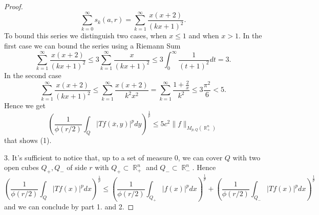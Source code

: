 \documentclass[12pt]{article}
\theoremstyle{definition}
\DeclareMathOperator\rr{\mathbb{R}}
\begin{document}
\begin{proof}
\[\sum_{k=0}^\infty s_k(a,r)= \sum_{k=1}^\infty \frac{x(x+2)}{(kx+1)^2}.\]
To bound this series we distinguish two cases, when $x\le 1$ and when $x>1$. In the first case we can bound the series using a Riemann Sum
\[ \sum_{k=1}^\infty \frac{x(x+2)}{(kx+1)^2} \le 3\sum_{k=1}^\infty \frac{x}{(kx+1)^2}\le 3 \int_0^\infty \frac{1}{(t+1)^2}dt=3. \]
In the second case
\[  \sum_{k=1}^\infty \frac{x(x+2)}{(kx+1)^2}  \le \sum_{k=1}^\infty \frac{x(x+2)}{k^2x^2}=\sum_{k=1}^\infty \frac{1+\frac{2}{x}}{k^2} \le 3 \frac{\pi^2}{6}<5.\]
Hence we get 
\[\left(\frac{1}{\phi(r/2)}\int_Q|Tf(\overline x,y)|^p dy\right)^{\frac{1}{p}} \le 5c^2 \| f\|_{M_{p,Q}(\rr^n_+)} \]
that shows (1). 

3. It's sufficient to notice that, up to a set of measure 0,  we can cover $Q$ with two open cubes $Q_+,Q_-$ of side $r$ with $Q_+\subset \rr^n_+$ and $Q_-\subset \rr^n_-.$ Hence
\[ \left(\frac{1}{\phi(r/2)}\int_Q |Tf(x)|^pdx \right)^{\frac{1}{p}}\le\left(\frac{1}{\phi(r/2)}\int_{Q_+} |f(x)|^pdx \right)^{\frac{1}{p}}+\left(\frac{1}{\phi(r/2)}\int_{Q_-} |Tf(x)|^pdx \right)^{\frac{1}{p}} \]
and we can conclude by part 1. and 2.
\end{proof} 


\[

\]
\end{document}
